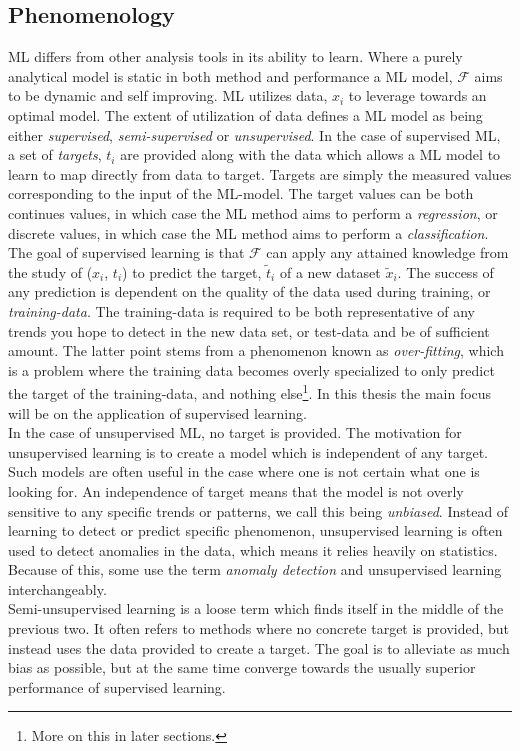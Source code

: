 \subsection{Phenomenology}
\ac{ML} differs from other analysis tools in its ability to
learn. Where a purely analytical model is static in both method 
and performance a \ac{ML} model, $\mathcal{F}$ aims to be dynamic and self 
improving. \ac{ML} utilizes data, $x_i$ to leverage towards an optimal
model. The extent of utilization of data defines a \ac{ML} model as being
either \emph{supervised}, \emph{semi-supervised} or \emph{unsupervised}. In the case 
of supervised \ac{ML}, a set of \emph{targets}, $t_i$ are provided along with the
data which allows a \ac{ML} model to learn to map directly from data to target. Targets
are simply the measured values corresponding to the input of the \ac{ML}-model. The target
values can be both continues values, in which case the \ac{ML} method aims to perform a \emph{regression},
or discrete values, in which case the \ac{ML} method aims to perform a \emph{classification}. 
\\
The goal of supervised learning is that $\mathcal{F}$ can apply any attained knowledge from 
the study of ($x_i$, $t_i$) to predict the target, $\tilde{t}_i$ of a new dataset
$\tilde{x}_i$. The success of any prediction is dependent on the quality of the 
data used during training, or \emph{training-data}. The training-data is required to 
be both representative of any trends you hope to detect in the new data set, or test-data
and be of sufficient amount. The latter point stems from a phenomenon known as \emph{over-fitting},
which is a problem where the training data becomes overly specialized to only predict 
the target of the training-data, and nothing else\footnote{More on this in later sections.}.
In this thesis the main focus will be on the application of supervised learning.
\\
In the case of unsupervised \ac{ML}, no target is provided. The motivation for unsupervised
learning is to create a model which is independent of any target. Such models are often 
useful in the case where one is not certain what one is looking for. An independence of target
means that the model is not overly sensitive to any specific trends or patterns, we call
this being \emph{unbiased}. Instead of learning to detect or predict specific phenomenon,
unsupervised learning is often used to detect anomalies in the data, which means it relies
heavily on statistics. Because of this, some use the term \emph{anomaly detection} and 
unsupervised learning interchangeably.
\\
 Semi-unsupervised learning is a loose term
which finds itself in the middle of the previous two. It often refers to methods where 
no concrete target is provided, but instead uses the data provided to create a target. The goal 
is to alleviate as much bias as possible, but at the same time converge towards the usually 
superior performance of supervised learning.  